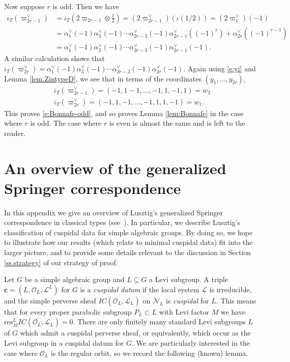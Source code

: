 \documentclass[reqno,11pt]{amsart}
\theoremstyle{remark}
\theoremstyle{remark}
\theoremstyle{definition}
\theoremstyle{definition}
\theoremstyle{definition}
\numberwithin{equation}{section}
\newcommand{\ga}{\alpha}
\newcommand{\cl}{\mathcal{L}}
\newcommand{\cn}{\mathcal{N}}
\newcommand{\co}{\mathcal{O}}
\newcommand{\vc}{\mathbf{c}}
\def\ibarT{\overline{\iota}_T}
\begin{document}
Now suppose $r$ is odd. Then we have 
\begin{align*}
\ibarT(\varpi_{2r-1}^\vee) &= \ibarT\left( 2 \varpi_{2r-1}\otimes \frac{1}{2} \right) = (2 \varpi_{2r-1}^{\vee} ) (\iota(1/2) )  = (2 \varpi_1^{\vee} ) (-1) \\
&= \ga_1^{\vee}(-1) \ga_3^{\vee}(-1) \cdots \ga_{2r-3}^{\vee}(-1) \ga_{2r-1}^\vee((-1)^{r}) + \ga_{2r}^\vee((-1)^{r-1}) \\
&=\ga_1^{\vee}(-1) \ga_3^{\vee}(-1) \cdots \ga_{2r-3}^{\vee}(-1)  \ga_{2r-1}^{\vee}(-1).
\end{align*}
A similar calculation shows that $\ibarT(\varpi_{2r}^{\vee})  =  \ga_1^{\vee}(-1) \ga_3^{\vee}(-1) \cdots \ga_{2r-3}^{\vee}(-1)  \ga_{2r}^{\vee}(-1)$.
Again using  \eqref{e:yi} and Lemma \ref{lem.ZintypeD}, we see that in 
terms of the coordinates $(y_1, \ldots, y_{2r})$,
\begin{align*}
\ibarT(\varpi_{2r-1}^{\vee}) = (-1,1 -1,\ldots, -1,1,-1,1) = w_2 \\
\ibarT(\varpi_{2r}^{\vee})  =  (-1,1,-1, \ldots, -1,1,1,-1) = w_1.
\end{align*}
This proves \eqref{e:Bonnafe-odd}, and so proves Lemma \ref{lem:Bonnafe} in the case where $r$ is odd.  The case where $r$ is even
is almost the same and is left to the reader.

\section{An overview of the generalized Springer correspondence} \label{s.overview}
In this appendix we give an overview of Lusztig's generalized Springer correspondence in classical types (see~\cite{Lu84}).  
In particular, we describe Lusztig's classification of cuspidal data for simple algebraic groups.  By doing so, we hope to illustrate
how our results (which relate to minimal cuspidal data) fit into the larger picture, and to provide some details
relevant to the discussion in Section \ref{ss.strategy} of our strategy of proof.

Let $G$ be a simple algebraic group and $L\subseteq G$ a Levi subgroup.  A triple $\vc = (L, \co_L, \cl^L)$ for $G$ is 
a \emph{cuspidal datum} 
if the local system $\cl$ is irreducible, and the simple perverse sheaf $IC(\overline{\co_L}, \cl_L)$ on $\cn_L$ is \emph{cuspidal} for $L$.  This means that for every proper parabolic subgroup $P_L\subset L$ with Levi factor $M$ we have $\mathrm{res}_{M}^L IC(\overline{\co_L}, \cl_L)=0$.  There are only finitely many standard Levi subgroups $L$ of $G$ which admit a cuspidal perverse sheaf, or equivalently, which occur as the Levi subgroup in a cuspidal datum for $G$. We are particularly interested in the case where $\co_L$ is the regular orbit, so we record the following (known) lemma.
 
\end{document}
